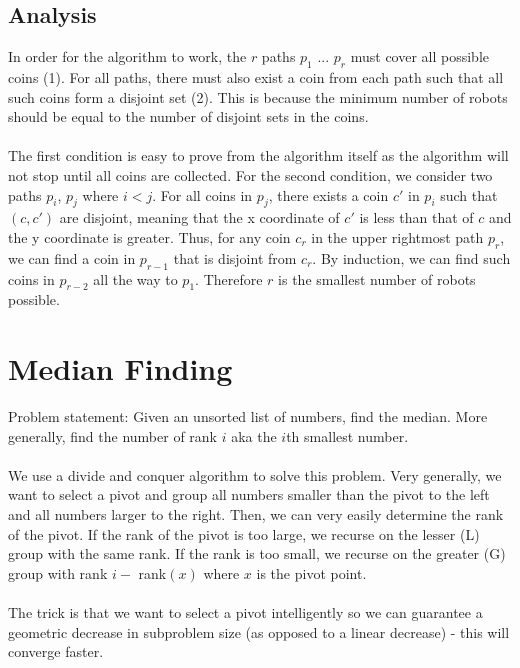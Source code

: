 \documentclass{article}
\begin{document}
\subsection*{Analysis}
In order for the algorithm to work, the $r$ paths $p_1$ ... $p_r$ must cover all possible coins (1). For all paths, there must also exist a coin from each path such that all such coins form a disjoint set (2). This is because the minimum number of robots should be equal to the number of disjoint sets in the coins.
\\
\\
The first condition is easy to prove from the algorithm itself as the algorithm will not stop until all coins are collected. For the second condition, we consider two paths $p_i$, $p_j$ where $i < j$. For all coins in $p_j$, there exists a coin $c'$ in $p_i$ such that $(c, c')$ are disjoint, meaning that the x coordinate of $c'$ is less than that of $c$ and the y coordinate is greater. Thus, for any coin $c_r$ in the upper rightmost path $p_r$, we can find a coin in $p_{r-1}$ that is disjoint from $c_r$. By induction, we can find such coins in $p_{r-2}$ all the way to $p_1$. Therefore $r$ is the smallest number of robots possible. 
\newpage
\section{Median Finding}
Problem statement: Given an unsorted list of numbers, find the median. More generally, find the number of rank $i$ aka the $i$th smallest number.
\\
\\
We use a divide and conquer algorithm to solve this problem. Very generally, we want to select a pivot and group all numbers smaller than the pivot to the left and all numbers larger to the right. Then, we can very easily determine the rank of the pivot. If the rank of the pivot is too large, we recurse on the lesser (L) group with the same rank. If the rank is too small, we recurse on the greater (G) group with rank $i -$ rank$(x)$ where $x$ is the pivot point.
\\
\\
The trick is that we want to select a pivot intelligently so we can guarantee a geometric decrease in subproblem size (as opposed to a linear decrease) - this will converge faster.
\end{document}
